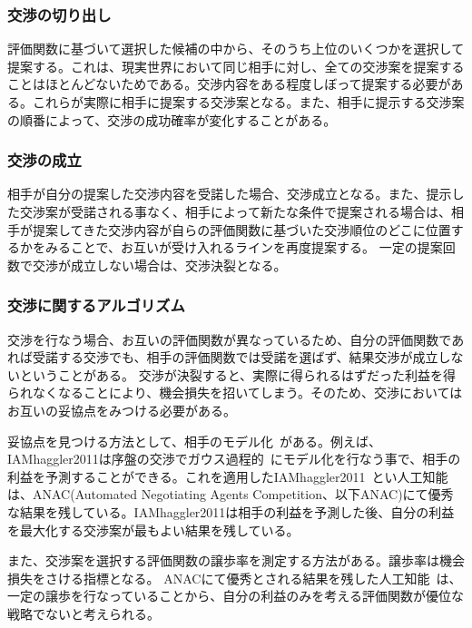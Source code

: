\documentclass[a4, 10pt,dvipdfmx]{jsarticle}
\begin{document}
\subsubsection*{交渉の切り出し}
評価関数に基づいて選択した候補の中から、そのうち上位のいくつかを選択して提案する。これは、現実世界において同じ相手に対し、全ての交渉案を提案することはほとんどないためである。交渉内容をある程度しぼって提案する必要がある。これらが実際に相手に提案する交渉案となる。また、相手に提示する交渉案の順番によって、交渉の成功確率が変化することがある。

\subsubsection*{交渉の成立}
相手が自分の提案した交渉内容を受諾した場合、交渉成立となる。また、提示した交渉案が受諾される事なく、相手によって新たな条件で提案される場合は、相手が提案してきた交渉内容が自らの評価関数に基づいた交渉順位のどこに位置するかをみることで、お互いが受け入れるラインを再度提案する。
一定の提案回数で交渉が成立しない場合は、交渉決裂となる。

\subsubsection{交渉に関するアルゴリズム}
交渉を行なう場合、お互いの評価関数が異なっているため、自分の評価関数であれば受諾する交渉でも、相手の評価関数では受諾を選ばず、結果交渉が成立しないということがある。
交渉が決裂すると、実際に得られるはずだった利益を得られなくなることにより、機会損失を招いてしまう。そのため、交渉においてはお互いの妥協点をみつける必要がある。

妥協点を見つける方法として、相手のモデル化~\cite{baarslag2012evaluating}がある。例えば、IAMhaggler2011は序盤の交渉でガウス過程的~\cite{rasmussen2006gaussian}にモデル化を行なう事で、相手の利益を予測することができる。これを適用したIAMhaggler2011~\cite{williams2013iamhaggler2011}とい人工知能は、ANAC(Automated Negotiating Agents Competition、以下ANAC)にて優秀な結果を残している。IAMhaggler2011は相手の利益を予測した後、自分の利益を最大化する交渉案が最もよい結果を残している。

また、交渉案を選択する評価関数の譲歩率を測定する方法\cite{baarslag2012evaluating}がある。譲歩率は機会損失をさける指標となる。
ANACにて優秀とされる結果を残した人工知能~\cite{baarslag2012evaluating}は、一定の譲歩を行なっていることから、自分の利益のみを考える評価関数が優位な戦略でないと考えられる。



\end{document}
